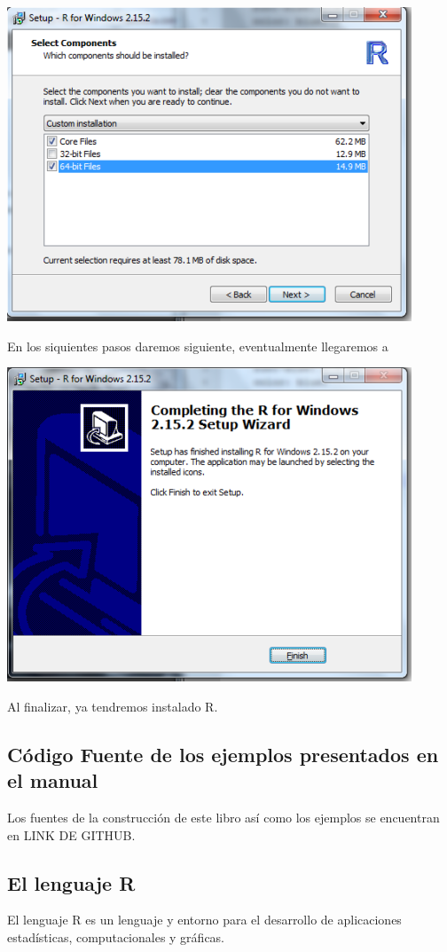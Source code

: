 \documentclass[12pt,hidelinks]{article}
\begin{document}
	\begin{center}
		\includegraphics[scale=0.9]{images/1/install3-3.png}
	\end{center}
	En los siquientes pasos daremos siguiente, eventualmente llegaremos a
	\begin{center}
		\includegraphics[scale=0.9]{images/1/install3-4.png}
	\end{center}
	Al finalizar, ya tendremos instalado R.
	\subsection{Código Fuente de los ejemplos presentados en el manual}
	Los fuentes de la construcción de este libro así como los ejemplos se encuentran en LINK DE GITHUB.
	\subsection{El lenguaje R}
	El lenguaje R es un lenguaje y entorno para el desarrollo de aplicaciones estadísticas, computacionales y gráficas.
\end{document}

